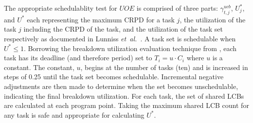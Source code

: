 The appropriate schedulablity test for ${UOE}$ is comprised of three parts: ${\gamma^{ucb}_{t,j}}$, ${U^*_j}$, and ${U^*}$ each representing
the maximum CRPD for a task ${j}$, the utilization of the task ${j}$ including the CRPD of the task, and the utilization of the task set
respectively as documented in Lunniss \emph{et~al.}~\cite{lunniss:13}. A task set is schedulable when ${U^* \le 1}$.
%
\newline
\indent
%
Borrowing the breakdown utilization evaluation technique from \cite{lunniss:13}, each task has its deadline (and therefore period) set to ${T_i = u \cdot C_i}$ where ${u}$ is a constant. The constant, ${u}$, begins at the number of tasks (ten) and is increased in steps of 0.25 until the task set becomes schedulable. Incremental negative adjustments are then made to determine when the set becomes unschedulable, indicating the final breakdown utilization.
%
For each task, the set of shared LCBs are calculated at each program point. Taking the maximum shared LCB count for any task is safe and appropriate for calculating ${U^*}$.

